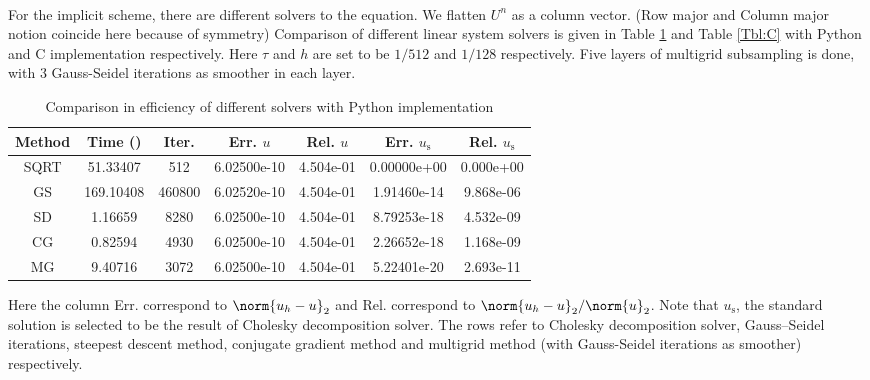 \documentclass[english, nochinese]{pkupaper}
\begin{document}
\begin{thmquestion}
\ 
\begin{thmanswer}
For the implicit scheme, there are different solvers to the equation. We flatten $U^n$ as a column vector. (Row major and Column major notion coincide here because of symmetry) Comparison of different linear system solvers is given in Table \ref{Tbl:Python} and Table \ref{Tbl:C} with Python and C implementation respectively. Here $\tau$ and $h$ are set to be $ 1 / 512 $ and $ 1 / 128 $ respectively. Five layers of multigrid subsampling is done, with 3 Gauss-Seidel iterations as smoother in each layer.

\begin{table}[htbp]
\centering
\caption{Comparison in efficiency of different solvers with Python implementation}
\label{Tbl:Python}
\begin{tabular}{|c|c|c|c|c|c|c|}
\hline
Method & Time (\Si{s}) & Iter. & Err. $u$ & Rel. $u$ & Err. $u_{\text{s}}$ & Rel. $u_{\text{s}}$ \\
\hline
SQRT & 51.33407 & 512 & 6.02500e-10 & 4.504e-01 & 0.00000e+00 & 0.000e+00 \\
\hline
GS & 169.10408 & 460800 & 6.02520e-10 & 4.504e-01 & 1.91460e-14 & 9.868e-06 \\
\hline
SD & 1.16659 & 8280 & 6.02500e-10 & 4.504e-01 & 8.79253e-18 & 4.532e-09 \\
\hline
CG & 0.82594 & 4930 & 6.02500e-10 & 4.504e-01 & 2.26652e-18 & 1.168e-09 \\
\hline
MG & 9.40716 & 3072 & 6.02500e-10 & 4.504e-01 & 5.22401e-20 & 2.693e-11 \\
\hline
\end{tabular}
\vskip 6pt
\raggedright
\footnotesize
Here the column Err. correspond to $ \norm{ u_h - u }_2 $ and Rel. correspond to $ \norm{ u_h - u }_2 / \norm{u}_2 $. Note that $u_{\text{s}}$, the standard solution is selected to be the result of Cholesky decomposition solver. The rows refer to Cholesky decomposition solver, Gauss--Seidel iterations, steepest descent method, conjugate gradient method and multigrid method (with Gauss-Seidel iterations as smoother) respectively.
\end{table}


\end{thmanswer}
\end{thmquestion}
\end{document}
